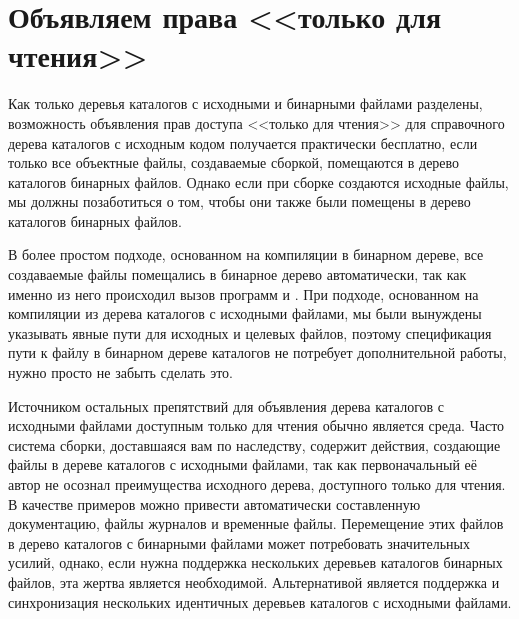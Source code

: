 \section{Объявляем права <<только для чтения>>}

Как только деревья каталогов с исходными и бинарными файлами
разделены, возможность объявления прав доступа <<только для чтения>>
для справочного дерева каталогов с исходным кодом получается
практически бесплатно, если только все объектные файлы, создаваемые
сборкой, помещаются в дерево каталогов бинарных файлов. Однако если
при сборке создаются исходные файлы, мы должны позаботиться о том,
чтобы они также были помещены в дерево каталогов бинарных файлов.

В более простом подходе, основанном на компиляции в бинарном дереве,
все создаваемые файлы помещались в бинарное дерево автоматически, так
как именно из него происходил вызов программ  и
. При подходе, основанном на компиляции из дерева
каталогов с исходными файлами, мы были вынуждены указывать явные пути
для исходных и целевых файлов, поэтому спецификация пути к файлу в
бинарном дереве каталогов не потребует дополнительной работы, нужно
просто не забыть сделать это.

Источником остальных препятствий для объявления дерева каталогов с
исходными файлами доступным только для чтения обычно является среда.
Часто система сборки, доставшаяся вам по наследству, содержит
действия, создающие файлы в дереве каталогов с исходными файлами, так
как первоначальный её автор не осознал преимущества исходного дерева,
доступного только для чтения. В качестве примеров можно привести
автоматически составленную документацию, файлы журналов и временные
файлы. Перемещение этих файлов в дерево каталогов с бинарными файлами
может потребовать значительных усилий, однако, если нужна поддержка
нескольких деревьев каталогов бинарных файлов, эта жертва является
необходимой. Альтернативой является поддержка и синхронизация
нескольких идентичных деревьев каталогов с исходными файлами.
